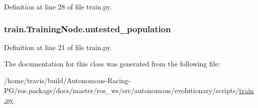 Definition at line 28 of file train.\+py.

\subsubsection[{\texorpdfstring{untested\+\_\+population}{untested_population}}]{\setlength{\rightskip}{0pt plus 5cm}train.\+Training\+Node.\+untested\+\_\+population}\hypertarget{classtrain_1_1_training_node_a6724c3a14d24c6d8d6a4d7e29126627f}{}\label{classtrain_1_1_training_node_a6724c3a14d24c6d8d6a4d7e29126627f}


Definition at line 21 of file train.\+py.



The documentation for this class was generated from the following file\+:\begin{DoxyCompactItemize}
\item 
/home/travis/build/\+Autonomous-\/\+Racing-\/\+P\+G/ros.\+package/docs/master/ros\+\_\+ws/src/autonomous/evolutionary/scripts/\hyperlink{evolutionary_2scripts_2train_8py}{train.\+py}\end{DoxyCompactItemize}
